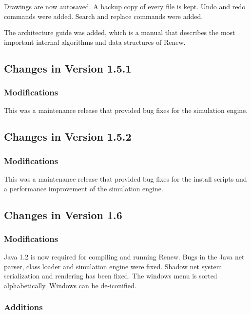 Drawings are now autosaved. A backup copy of every file is kept.
Undo and redo commands were added. Search and replace commands
were added.

The architecture guide was added, which is a manual that
describes the most important internal algorithms
and data structures of Renew.


\subsection{Changes in Version 1.5.1}

\subsubsection*{Modifications}

This was a maintenance release that provided
bug fixes for the simulation engine.

\subsection{Changes in Version 1.5.2}

\subsubsection*{Modifications}

This was a maintenance release that provided
bug fixes for the install scripts and a performance improvement
of the simulation engine.


\subsection{Changes in Version 1.6}

\subsubsection*{Modifications}

Java 1.2 is now required for compiling and running Renew.
Bugs in the Java net parser, class loader and simulation engine
were fixed.
Shadow net system serialization and rendering has been fixed.
The windows menu is sorted alphabetically.
Windows can be de-iconified.

\subsubsection*{Additions}

